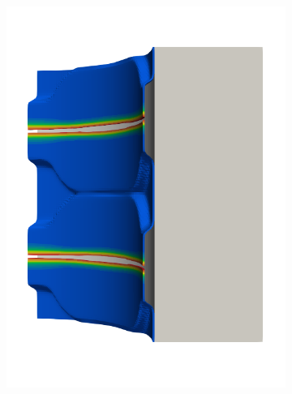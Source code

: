 \begin{frame}
\begin{columns}[T]
\begin{column}{0.6\textwidth}
\begin{figure}
{\begin{subfigure}{0.19\textwidth}
            \includegraphics[width=\textwidth]{Chapter345/figures/seed_d_7}
          \end{subfigure}
          \hspace{0.06\textwidth}
          \begin{subfigure}{0.19\textwidth}
            \centering

\end{subfigure}}
\end{figure}
\end{column}
\end{columns}
\end{frame}
